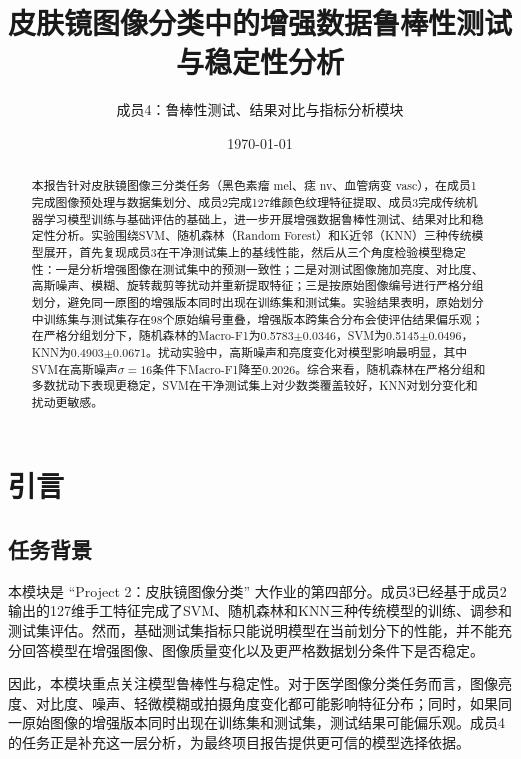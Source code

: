 \documentclass[12pt,a4paper]{ctexart}
\title{\textbf{皮肤镜图像分类中的增强数据鲁棒性测试与稳定性分析}}
\author{成员4：鲁棒性测试、结果对比与指标分析模块}
\date{\today}
\begin{document}
\maketitle

\begin{abstract}
本报告针对皮肤镜图像三分类任务（黑色素瘤 mel、痣 nv、血管病变 vasc），在成员1完成图像预处理与数据集划分、成员2完成127维颜色纹理特征提取、成员3完成传统机器学习模型训练与基础评估的基础上，进一步开展增强数据鲁棒性测试、结果对比和稳定性分析。实验围绕SVM、随机森林（Random Forest）和K近邻（KNN）三种传统模型展开，首先复现成员3在干净测试集上的基线性能，然后从三个角度检验模型稳定性：一是分析增强图像在测试集中的预测一致性；二是对测试图像施加亮度、对比度、高斯噪声、模糊、旋转裁剪等扰动并重新提取特征；三是按原始图像编号进行严格分组划分，避免同一原图的增强版本同时出现在训练集和测试集。实验结果表明，原始划分中训练集与测试集存在98个原始编号重叠，增强版本跨集合分布会使评估结果偏乐观；在严格分组划分下，随机森林的Macro-F1为0.5783$\pm$0.0346，SVM为0.5145$\pm$0.0496，KNN为0.4903$\pm$0.0671。扰动实验中，高斯噪声和亮度变化对模型影响最明显，其中SVM在高斯噪声$\sigma=16$条件下Macro-F1降至0.2026。综合来看，随机森林在严格分组和多数扰动下表现更稳定，SVM在干净测试集上对少数类覆盖较好，KNN对划分变化和扰动更敏感。
\end{abstract}

\section{引言}

\subsection{任务背景}
本模块是 ``Project 2：皮肤镜图像分类'' 大作业的第四部分。成员3已经基于成员2输出的127维手工特征完成了SVM、随机森林和KNN三种传统模型的训练、调参和测试集评估。然而，基础测试集指标只能说明模型在当前划分下的性能，并不能充分回答模型在增强图像、图像质量变化以及更严格数据划分条件下是否稳定。

因此，本模块重点关注模型鲁棒性与稳定性。对于医学图像分类任务而言，图像亮度、对比度、噪声、轻微模糊或拍摄角度变化都可能影响特征分布；同时，如果同一原始图像的增强版本同时出现在训练集和测试集，测试结果可能偏乐观。成员4的任务正是补充这一层分析，为最终项目报告提供更可信的模型选择依据。
\end{document}
